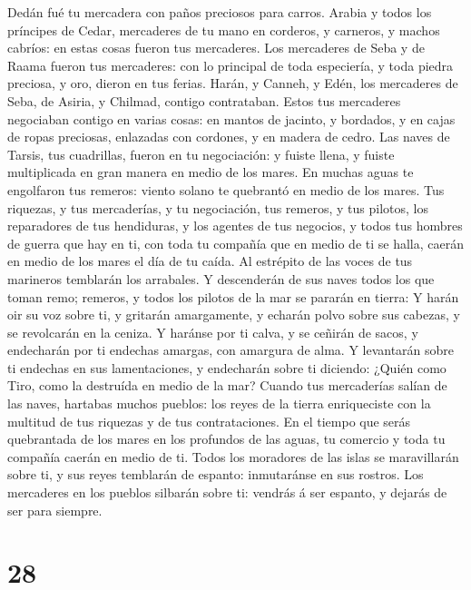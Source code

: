 Dedán fué tu mercadera con paños preciosos para carros. 
Arabia y todos los príncipes de Cedar, mercaderes de tu mano en
corderos, y carneros, y machos cabríos: en estas cosas fueron tus
mercaderes.  Los mercaderes de Seba y de Raama fueron tus
mercaderes: con lo principal de toda especiería, y toda piedra preciosa,
y oro, dieron en tus ferias.  Harán, y Canneh, y Edén,
los mercaderes de Seba, de Asiria, y Chilmad, contigo contrataban.
 Estos tus mercaderes negociaban contigo en varias cosas:
en mantos de jacinto, y bordados, y en cajas de ropas preciosas,
enlazadas con cordones, y en madera de cedro.  Las naves
de Tarsis, tus cuadrillas, fueron en tu negociación: y fuiste llena, y
fuiste multiplicada en gran manera en medio de los mares.
 En muchas aguas te engolfaron tus remeros: viento solano
te quebrantó en medio de los mares.  Tus riquezas, y tus
mercaderías, y tu negociación, tus remeros, y tus pilotos, los
reparadores de tus hendiduras, y los agentes de tus negocios, y todos
tus hombres de guerra que hay en ti, con toda tu compañía que en medio
de ti se halla, caerán en medio de los mares el día de tu caída.
 Al estrépito de las voces de tus marineros temblarán los
arrabales.  Y descenderán de sus naves todos los que
toman remo; remeros, y todos los pilotos de la mar se pararán en tierra:
 Y harán oir su voz sobre ti, y gritarán amargamente, y
echarán polvo sobre sus cabezas, y se revolcarán en la ceniza.
 Y haránse por ti calva, y se ceñirán de sacos, y
endecharán por ti endechas amargas, con amargura de alma.
 Y levantarán sobre ti endechas en sus lamentaciones, y
endecharán sobre ti diciendo: ¿Quién como Tiro, como la destruída en
medio de la mar?  Cuando tus mercaderías salían de las
naves, hartabas muchos pueblos: los reyes de la tierra enriqueciste con
la multitud de tus riquezas y de tus contrataciones.  En
el tiempo que serás quebrantada de los mares en los profundos de las
aguas, tu comercio y toda tu compañía caerán en medio de ti.
 Todos los moradores de las islas se maravillarán sobre
ti, y sus reyes temblarán de espanto: inmutaránse en sus rostros.
 Los mercaderes en los pueblos silbarán sobre ti: vendrás
á ser espanto, y dejarás de ser para siempre.

\hypertarget{section-27}{%
\section{28}\label{section-27}}

